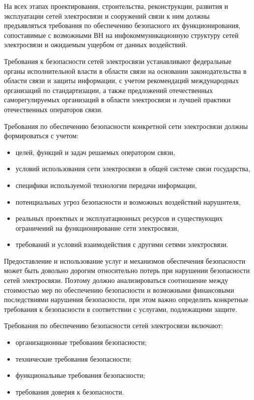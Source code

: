 \documentclass[12pt, russian, oneside, article]{ncc}
\begin{document}
На всех этапах проектирования, строительства, реконструкции, развития и эксплуатации сетей электросвязи и сооружений связи к ним должны предъявляться требования по обеспечению безопасного их функционирования, сопоставимые с возможными ВН на инфокоммуникационную структуру сетей электросвязи и ожидаемым ущербом от данных воздействий.

Требования к безопасности сетей электросвязи устанавливают федеральные органы исполнительной власти в области связи на основании законодательства в области связи и защиты информации, с учетом рекомендаций международных организаций по стандартизации, а также предложений отечественных саморегулируемых организаций в области электросвязи и лучшей практики отечественных операторов связи.

Требования по обеспечению безопасности конкретной сети электросвязи должны формироваться с учетом:
\begin{itemize}
\item целей, функций и задач решаемых оператором связи,
\item условий использования сети электросвязи в общей системе связи государства,
\item специфики используемой технологии передачи информации,
\item потенциальных угроз безопасности и возможных воздействий нарушителя,
\item реальных проектных и эксплуатационных ресурсов и существующих ограничений на функционирование сети электросвязи,
\item требований и условий взаимодействия с другими сетями электросвязи.
\end{itemize}

Предоставление и использование услуг и механизмов обеспечения безопасности может быть довольно дорогим относительно потерь при нарушении безопасности сетей электросвязи. Поэтому должно анализироваться соотношение между стоимостью мер по обеспечению безопасности и возможными финансовыми последствиями нарушения безопасности, при этом важно определить конкретные требования к безопасности в соответствии с услугами, подлежащими защите.

Требования по обеспечению безопасности сетей электросвязи включают:
\begin{itemize}
\item организационные требования безопасности;
\item технические требования безопасности;
\item функциональные требования безопасности;
\item требования доверия к безопасности.
\end{itemize}
\end{document}
